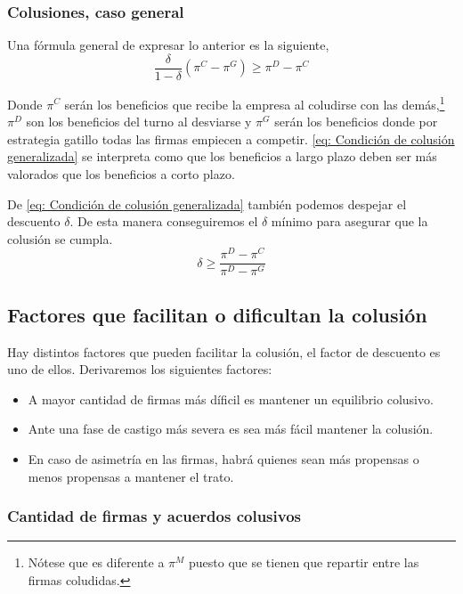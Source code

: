 \subsubsection*{Colusiones, caso general}

Una fórmula general de expresar lo anterior es la siguiente,
\begin{equation}
    \frac{\delta }{1-\delta} (\pi ^C - \pi^{G}) \geq \pi ^D- \pi^C \label{eq: Condición de colusión generalizada}
\end{equation}

Donde $\pi^C$ serán los beneficios que recibe la empresa al coludirse con las demás,\footnote{Nótese que es diferente a $\pi^M$ puesto que se tienen que repartir entre las firmas coludidas.} $\pi^D$ son los beneficios del turno al desviarse y $\pi^G$ serán los beneficios donde por estrategia gatillo todas las firmas empiecen a competir. \ref{eq: Condición de colusión generalizada} se interpreta como que los beneficios a largo plazo deben ser más valorados que los beneficios a corto plazo. 

De \ref{eq: Condición de colusión generalizada} también podemos despejar el descuento $\delta$. De esta manera conseguiremos el $\delta$ mínimo para asegurar que la colusión se cumpla.
\begin{equation}
    \delta \geq \frac{\pi^D - \pi ^C}{\pi^D- \pi^G} \label{eq: Condición Descuento}
\end{equation}

\subsection{Factores que facilitan o dificultan la colusión}

Hay distintos factores que pueden facilitar la colusión, el factor de descuento es uno de ellos. Derivaremos los siguientes factores:
\begin{itemize}
    \item A mayor cantidad de firmas más díficil es mantener un equilibrio colusivo.
    \item Ante una fase de castigo más severa es sea más fácil mantener la colusión.
    \item En caso de asimetría en las firmas, habrá quienes sean más propensas o menos propensas a mantener el trato.
\end{itemize}

\subsubsection*{Cantidad de firmas y acuerdos colusivos}

